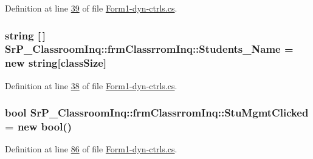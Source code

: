 \-Definition at line \hyperlink{_form1-dyn-ctrls_8cs_source_l00039}{39} of file \hyperlink{_form1-dyn-ctrls_8cs_source}{\-Form1-\/dyn-\/ctrls.\-cs}.

\hypertarget{class_sr_p___classroom_inq_1_1frm_classrrom_inq_ad595ee0cb55235eda789723fe8967521}{
\subsubsection[{\-Students\-\_\-\-Name}]{\setlength{\rightskip}{0pt plus 5cm}string \mbox{[}$\,$\mbox{]} {\bf \-Sr\-P\-\_\-\-Classroom\-Inq\-::frm\-Classrrom\-Inq\-::\-Students\-\_\-\-Name} = new string\mbox{[}{\bf class\-Size}\mbox{]}}}
\label{class_sr_p___classroom_inq_1_1frm_classrrom_inq_ad595ee0cb55235eda789723fe8967521}


\-Definition at line \hyperlink{_form1-dyn-ctrls_8cs_source_l00038}{38} of file \hyperlink{_form1-dyn-ctrls_8cs_source}{\-Form1-\/dyn-\/ctrls.\-cs}.

\hypertarget{class_sr_p___classroom_inq_1_1frm_classrrom_inq_ad0a57ebb96913cfbb9622d8c4c7b52cb}{
\subsubsection[{\-Stu\-Mgmt\-Clicked}]{\setlength{\rightskip}{0pt plus 5cm}bool {\bf \-Sr\-P\-\_\-\-Classroom\-Inq\-::frm\-Classrrom\-Inq\-::\-Stu\-Mgmt\-Clicked} = new bool()}}
\label{class_sr_p___classroom_inq_1_1frm_classrrom_inq_ad0a57ebb96913cfbb9622d8c4c7b52cb}


\-Definition at line \hyperlink{_form1-dyn-ctrls_8cs_source_l00086}{86} of file \hyperlink{_form1-dyn-ctrls_8cs_source}{\-Form1-\/dyn-\/ctrls.\-cs}.

